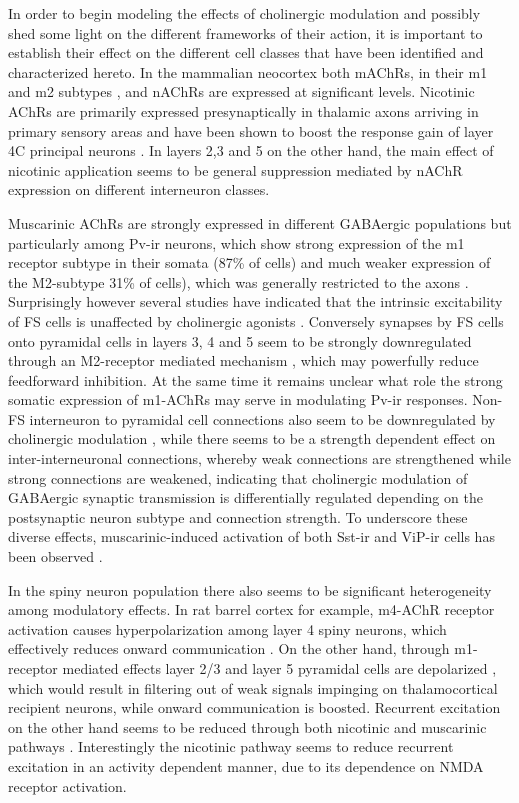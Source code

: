 In order to begin modeling the effects of cholinergic modulation and
possibly shed some light on the different frameworks of their action,
it is important to establish their effect on the different cell
classes that have been identified and characterized hereto. In the
mammalian neocortex both mAChRs, in their m1 and m2 subtypes
\citep{Tigges1997}, and nAChRs \citep{Han2000} are expressed at
significant levels. Nicotinic AChRs are primarily expressed
presynaptically in thalamic axons arriving in primary sensory areas
and have been shown to boost the response gain of layer 4C principal
neurons \citep{Disney2007,Gil1997}. In layers 2,3 and 5 on the other
hand, the main effect of nicotinic application seems to be general
suppression mediated by nAChR expression on different interneuron
classes.

Muscarinic AChRs are strongly expressed in different GABAergic
populations but particularly among Pv-ir neurons, which show strong
expression of the m1 receptor subtype in their somata (87\% of cells)
and much weaker expression of the M2-subtype 31\% of cells), which was
generally restricted to the axons \citep{Disney2008}. Surprisingly
however several studies have indicated that the intrinsic excitability
of FS cells is unaffected by cholinergic agonists
\citep{Gulledge2007,Kruglikov2008}. Conversely synapses by FS cells
onto pyramidal cells in layers 3, 4 and 5 seem to be strongly
downregulated through an M2-receptor mediated mechanism
\citep{Kruglikov2008}, which may powerfully reduce feedforward
inhibition. At the same time it remains unclear what role the strong
somatic expression of m1-AChRs may serve in modulating Pv-ir
responses. Non-FS interneuron to pyramidal cell connections also seem
to be downregulated by cholinergic modulation \citep{Yamamoto2010},
while there seems to be a strength dependent effect on
inter-interneuronal connections, whereby weak connections are
strengthened while strong connections are weakened, indicating that
cholinergic modulation of GABAergic synaptic transmission is
differentially regulated depending on the postsynaptic neuron subtype
and connection strength. To underscore these diverse effects,
muscarinic-induced activation of both Sst-ir and ViP-ir cells has been
observed \citep{Kawaguchi1997}.

In the spiny neuron population there also seems to be significant
heterogeneity among modulatory effects. In rat barrel cortex for
example, m4-AChR receptor activation causes hyperpolarization among
layer 4 spiny neurons, which effectively reduces onward communication
\citep{Eggermann2009}. On the other hand, through m1-receptor mediated
effects layer 2/3 and layer 5 pyramidal cells are depolarized
\citep{Eggermann2009}, which would result in filtering out of weak
signals impinging on thalamocortical recipient neurons, while onward
communication is boosted. Recurrent excitation on the other hand seems
to be reduced through both nicotinic and muscarinic pathways
\citep{Levy2006}. Interestingly the nicotinic pathway seems to reduce
recurrent excitation in an activity dependent manner, due to its
dependence on NMDA receptor activation.


